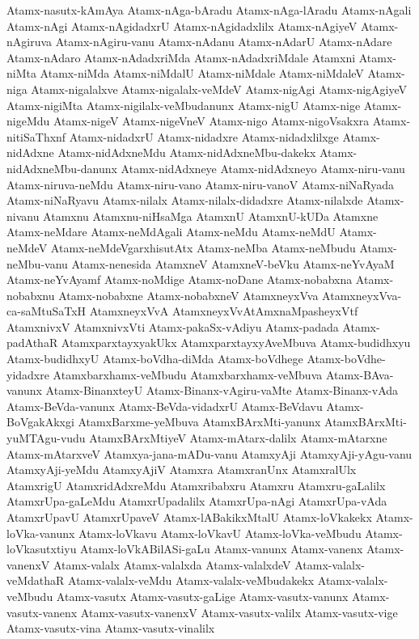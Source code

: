 {Atamx-nasutx-kAmAya
Atamx-nAga-bAradu
Atamx-nAga-lAradu
Atamx-nAgali
Atamx-nAgi
Atamx-nAgidadxrU
Atamx-nAgidadxlilx
Atamx-nAgiyeV
Atamx-nAgiruva
Atamx-nAgiru-vanu
Atamx-nAdanu
Atamx-nAdarU
Atamx-nAdare
Atamx-nAdaro
Atamx-nAdadxriMda
Atamx-nAdadxriMdale
Atamxni
Atamx-niMta
Atamx-niMda
Atamx-niMdalU
Atamx-niMdale
Atamx-niMdaleV
Atamx-niga
Atamx-nigalalxve
Atamx-nigalalx-veMdeV
Atamx-nigAgi
Atamx-nigAgiyeV
Atamx-nigiMta
Atamx-nigilalx-veMbudanunx
Atamx-nigU
Atamx-nige
Atamx-nigeMdu
Atamx-nigeV
Atamx-nigeVneV
Atamx-nigo
Atamx-nigoVsakxra
Atamx-nitiSaThxnf
Atamx-nidadxrU
Atamx-nidadxre
Atamx-nidadxlilxge
Atamx-nidAdxne
Atamx-nidAdxneMdu
Atamx-nidAdxneMbu-dakekx
Atamx-nidAdxneMbu-danunx
Atamx-nidAdxneye
Atamx-nidAdxneyo
Atamx-niru-vanu
Atamx-niruva-neMdu
Atamx-niru-vano
Atamx-niru-vanoV
Atamx-niNaRyada
Atamx-niNaRyavu
Atamx-nilalx
Atamx-nilalx-didadxre
Atamx-nilalxde
Atamx-nivanu
Atamxnu
Atamxnu-niHsaMga
AtamxnU
AtamxnU-kUDa
Atamxne
Atamx-neMdare
Atamx-neMdAgali
Atamx-neMdu
Atamx-neMdU
Atamx-neMdeV
Atamx-neMdeVgarxhisutAtx
Atamx-neMba
Atamx-neMbudu
Atamx-neMbu-vanu
Atamx-nenesida
AtamxneV
AtamxneV-beVku
Atamx-neYvAyaM
Atamx-neYvAyamf
Atamx-noMdige
Atamx-noDane
Atamx-nobabxna
Atamx-nobabxnu
Atamx-nobabxne
Atamx-nobabxneV
AtamxneyxVva
AtamxneyxVva-ca-saMtuSaTxH
AtamxneyxVvA
AtamxneyxVvAtAmxnaMpasheyxVtf
AtamxnivxV
AtamxnivxVti
Atamx-pakaSx-vAdiyu
Atamx-padada
Atamx-padAthaR
AtamxparxtayxyakUkx
AtamxparxtayxyAveMbuva
Atamx-budidhxyu
Atamx-budidhxyU
Atamx-boVdha-diMda
Atamx-boVdhege
Atamx-boVdhe-yidadxre
Atamxbarxhamx-veMbudu
Atamxbarxhamx-veMbuva
Atamx-BAva-vanunx
Atamx-BinanxteyU
Atamx-Binanx-vAgiru-vaMte
Atamx-Binanx-vAda
Atamx-BeVda-vanunx
Atamx-BeVda-vidadxrU
Atamx-BeVdavu
Atamx-BoVgakAkxgi
AtamxBarxme-yeMbuva
AtamxBArxMti-yanunx
AtamxBArxMti-yuMTAgu-vudu
AtamxBArxMtiyeV
Atamx-mAtarx-dalilx
Atamx-mAtarxne
Atamx-mAtarxveV
Atamxya-jana-mADu-vanu
AtamxyAji
AtamxyAji-yAgu-vanu
AtamxyAji-yeMdu
AtamxyAjiV
Atamxra
AtamxranUnx
AtamxralUlx
AtamxrigU
AtamxridAdxreMdu
Atamxribabxru
Atamxru
Atamxru-gaLalilx
AtamxrUpa-gaLeMdu
AtamxrUpadalilx
AtamxrUpa-nAgi
AtamxrUpa-vAda
AtamxrUpavU
AtamxrUpaveV
Atamx-lABakikxMtalU
Atamx-loVkakekx
Atamx-loVka-vanunx
Atamx-loVkavu
Atamx-loVkavU
Atamx-loVka-veMbudu
Atamx-loVkasutxtiyu
Atamx-loVkABilASi-gaLu
Atamx-vanunx
Atamx-vanenx
Atamx-vanenxV
Atamx-valalx
Atamx-valalxda
Atamx-valalxdeV
Atamx-valalx-veMdathaR
Atamx-valalx-veMdu
Atamx-valalx-veMbudakekx
Atamx-valalx-veMbudu
Atamx-vasutx
Atamx-vasutx-gaLige
Atamx-vasutx-vanunx
Atamx-vasutx-vanenx
Atamx-vasutx-vanenxV
Atamx-vasutx-valilx
Atamx-vasutx-vige
Atamx-vasutx-vina
Atamx-vasutx-vinalilx
}
